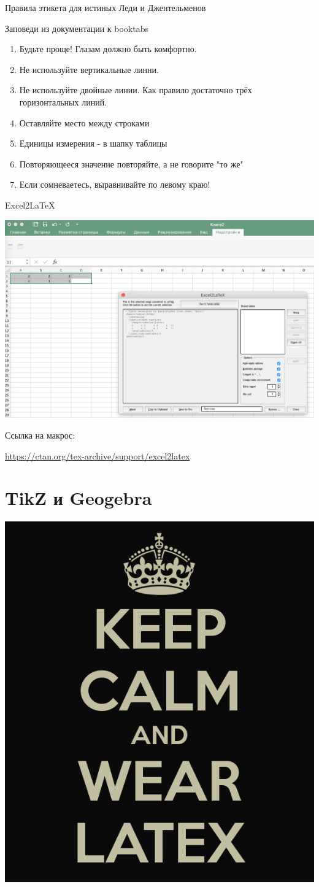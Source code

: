 \documentclass[aspectratio=169]{beamer} %
\begin{document}
\begin{frame}{Правила этикета для истиных Леди и Джентельменов} 
\begin{block}{Заповеди из документации к booktabs}
\begin{enumerate}
\item Будьте проще! Глазам должно быть комфортно.
\item Не используйте вертикальные линни.
\item Не используйте двойные линии. Как правило достаточно трёх горизонтальных линий.
\item Оставляйте место между строками
\item Единицы измерения - в шапку таблицы
\item Повторяющееся значение повторяйте, а не говорите "то же"
\item Если сомневаетесь, выравнивайте по левому краю!
\end{enumerate}
\end{block}
\end{frame}


\begin{frame}[plain]{Excel2LaTeX} 
\begin{center} \includegraphics[width=0.45\linewidth]{excel2latex.png}	
\end{center}

\begin{block}{Ссылка на макрос:}
	\vspace{3mm}
	\centerline {\url{https://ctan.org/tex-archive/support/excel2latex}}
	\vspace{3mm}
\end{block}
\end{frame}


\section{TikZ и Geogebra} 


\begingroup
{}
\begin{frame}[plain]
\centering \includegraphics[width=0.55\linewidth]{wearlatex.png}
\end{frame}
\endgroup 
\end{document}
